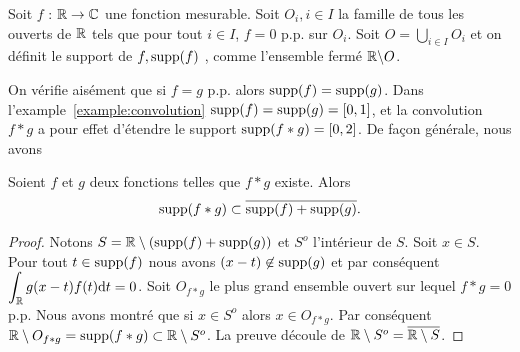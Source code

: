 \begin{definition}
Soit $f$ : $\mathbb{R}\rightarrow \mathbb{C}$ une fonction mesurable. Soit $O_{i}, i\in I$ la  famille de tous les ouverts de $\mathbb{R}$ tels que pour tout $i\in I$, $f=0$ p.p. sur $O_{i}$. Soit $O=\bigcup_{i\in I}O_{i}$ et on d\'efinit le support de $f, \mathrm{supp}(f)$ , comme l'ensemble ferm\'e $\mathbb{R}\backslash O$.
\end{definition}
On v\'erifie ais\'ement que si $f=g$ p.p. alors $\mathrm{supp}(f)=\mathrm{supp}(g)$. Dans l'example~\ref{example:convolution} $\mathrm{supp}(f)=\mathrm{supp}(g)=[0,1]$, et la  convolution $f*g$ a pour effet d'\'etendre le support $\mathrm{supp}(f*g)=[0,2]$. De fa\c{c}on g\'en\'erale, nous avons
\begin{lemma}
\label{lem:support-convolution}
Soient $f$ et $g$ deux fonctions telles que $f*g$ existe. Alors
$$
\mathrm{supp}(f*g)\subset\overline{\mathrm{supp}(f) + \mathrm{supp}(g)}.
$$
\end{lemma}
\begin{proof}
  Notons $S= \mathbb{R}\setminus (\mathrm{supp}(f)+\mathrm{supp}(g))$ et $S^{o}$ l'int\'erieur de $S$. Soit $x\in S$. Pour tout $t\in \mathrm{supp}(f)$ nous avons $(x-t)\not\in \mathrm{supp}(g)$ et par cons\'equent $\displaystyle \int_{\mathbb{R}}g(x-t)f(t)\mathrm{d} t=0$. Soit $O_{f*g}$ le plus grand ensemble ouvert sur lequel $f*g=0$ p.p.  Nous avons montr\'e que si $x\in S^{o}$ alors $x\in O_{f*g}$. Par cons\'equent $\mathbb{R}\setminus O_{f*g}=\mathrm{supp}(f*g) \subset \mathbb{R}\setminus S^{o}$. La preuve d\'ecoule de $\mathbb{R}\setminus S^{o}=\overline{\mathbb{R}\setminus S}$.
\end{proof}

